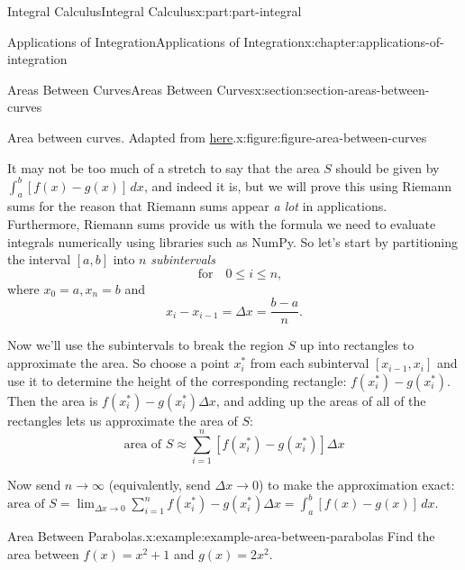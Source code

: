 \documentclass[twoside,10pt,]{book}
\numberwithin{equation}{part}
\begin{document}
\begin{partptx}{Integral Calculus}{}{Integral Calculus}{}{}{x:part:part-integral}
\begin{chapterptx}{Applications of Integration}{}{Applications of Integration}{}{}{x:chapter:applications-of-integration}
\begin{sectionptx}{Areas Between Curves}{}{Areas Between Curves}{}{}{x:section:section-areas-between-curves}
\begin{figureptx}{Area between curves. Adapted from \href{https://tex.stackexchange.com/questions/164773/graphics-area-between-curves}{here}\protect\footnotemark{}.}{x:figure:figure-area-between-curves}{}
\begin{image}{0.125}{0.75}{0.125}
{
}%
\end{image}%
\tcblower
\end{figureptx}%
%
It may not be too much of a stretch to say that the area \(S\) should be given by \(\int_{a}^{b}[f(x) - g(x)]\,dx\), and indeed it is, but we will prove this using Riemann sums for the reason that Riemann sums appear \emph{a lot} in applications. Furthermore, Riemann sums provide us with the formula we need to evaluate integrals numerically using libraries such as NumPy. So let's start by partitioning the interval \([a,b]\) into \(n\) \emph{subintervals}%
\begin{equation*}
[x_{i-1},x_{i}]\quad\text{for}\quad 0\leq i\leq n,
\end{equation*}
where \(x_{0} = a, x_{n} = b\) and%
\begin{equation*}
x_{i} - x_{i-1} = \Delta x = \frac{b-a}{n}.
\end{equation*}
%
\par
Now we'll use the subintervals to break the region \(S\) up into rectangles to approximate the area. So choose a point \(x_{i}^{*}\) from each subinterval \([x_{i-1}, x_{i}]\) and use it to determine the height of the corresponding rectangle: \(f(x_{i}^{*}) - g(x_{i}^{*})\). Then the area is \(f(x_{i}^{*}) - g(x_{i}^{*})\Delta x\), and adding up the areas of all of the rectangles lets us approximate the area of \(S\):%
\begin{equation}
\text{area of }S \approx \sum_{i=1}^{n}[f(x_{i}^{*}) - g(x_{i}^{*})]\Delta x\label{x:men:equation-area-between-curves-approximation}
\end{equation}
%
\par
Now send \(n\to\infty\) (equivalently, send \(\Delta x\to 0\)) to make the approximation exact: \(\text{area of }S = \lim_{\Delta x\to0}\sum_{i=1}^{n}f(x_{i}^{*}) - g(x_{i}^{*})\Delta x = \int_{a}^{b}[f(x) - g(x)]\,dx.\)%
\begin{example}{Area Between Parabolas.}{x:example:example-area-between-parabolas}%
Find the area between \(f(x) = x^{2} + 1\) and \(g(x) = 2x^{2}\).%
\par\smallskip%

\end{example}
\end{sectionptx}
\end{chapterptx}
\end{partptx}
\end{document}
